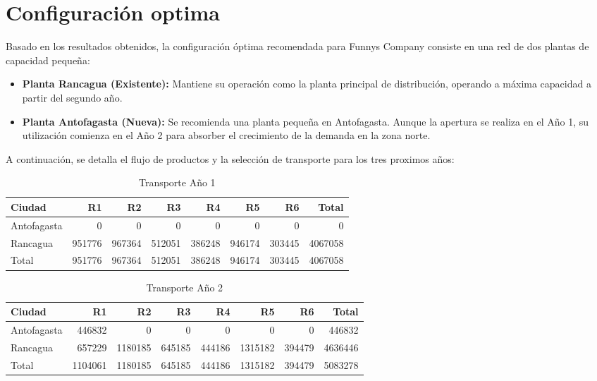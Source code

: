 \documentclass{article}
\begin{document}
\section{Configuración optima}

Basado en los resultados obtenidos, la configuración óptima recomendada para Funnys Company consiste en una red de dos plantas de capacidad pequeña:

\begin{itemize}
\item \textbf{Planta Rancagua (Existente):} Mantiene su operación como la planta principal de distribución, operando a máxima capacidad a partir del segundo año.
\item \textbf{Planta Antofagasta (Nueva):} Se recomienda una planta pequeña en Antofagasta. Aunque la apertura se realiza en el Año 1, su utilización comienza en el Año 2 para absorber el crecimiento de la demanda en la zona norte.
\end{itemize}

A continuación, se detalla el flujo de productos y la selección de transporte para los tres proximos años:

\begin{table}[h!]
\centering
\begin{tabular}{lrrrrrrr}
\hline
Ciudad & R1 & R2 & R3 & R4 & R5 & R6 & Total \\
\hline
Antofagasta & 0 & 0 & 0 & 0 & 0 & 0 & 0 \\
Rancagua & 951776 & 967364 & 512051 & 386248 & 946174 & 303445 & 4067058 \\
\hline
Total & 951776 & 967364 & 512051 & 386248 & 946174 & 303445 & 4067058 \\
\hline
\end{tabular}
\caption{Transporte Año 1}
\end{table}

\begin{table}[h!]
\centering
\begin{tabular}{lrrrrrrr}
\hline
Ciudad & R1 & R2 & R3 & R4 & R5 & R6 & Total \\
\hline
Antofagasta & 446832 & 0 & 0 & 0 & 0 & 0 & 446832 \\
Rancagua & 657229 & 1180185 & 645185 & 444186 & 1315182 & 394479 & 4636446 \\
\hline
Total & 1104061 & 1180185 & 645185 & 444186 & 1315182 & 394479 & 5083278 \\
\hline
\end{tabular}
\caption{Transporte Año 2}
\end{table}
\end{document}
